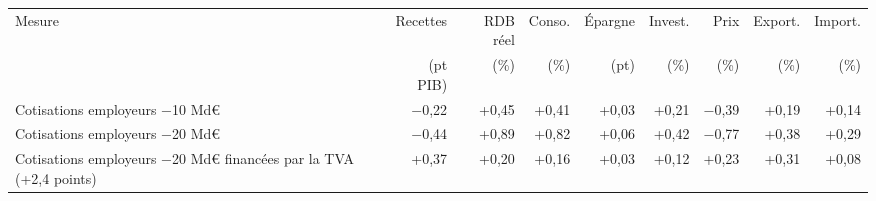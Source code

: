 \begin{tabular}{p{5.0cm}rrrrrrrr}
\toprule
Mesure & Recettes & RDB réel & Conso. & Épargne & Invest. & Prix & Export. & Import. \\
 & (pt PIB) & (\%) & (\%) & (pt) & (\%) & (\%) & (\%) & (\%) \\
\midrule
Cotisations employeurs −10 Md€ & $-$0{,}22 & +0{,}45 & +0{,}41 & +0{,}03 & +0{,}21 & $-$0{,}39 & +0{,}19 & +0{,}14 \\
Cotisations employeurs −20 Md€ & $-$0{,}44 & +0{,}89 & +0{,}82 & +0{,}06 & +0{,}42 & $-$0{,}77 & +0{,}38 & +0{,}29 \\
Cotisations employeurs −20 Md€ financées par la TVA (+2,4 points) & +0{,}37 & +0{,}20 & +0{,}16 & +0{,}03 & +0{,}12 & +0{,}23 & +0{,}31 & +0{,}08 \\
\bottomrule
\end{tabular}
